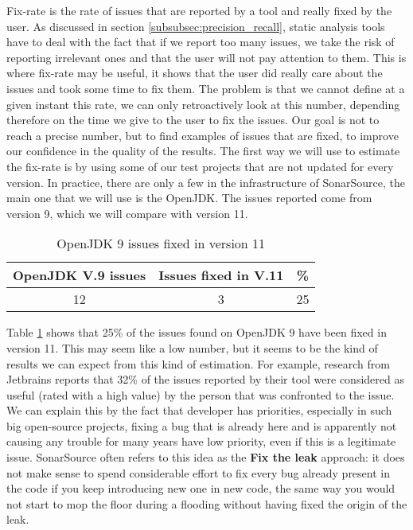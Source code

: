 Fix-rate is the rate of issues that are reported by a tool and really fixed by the user. 
As discussed in section \ref{subsubsec:precision_recall}, static analysis tools have to deal with the fact that if we report too many issues, we take the risk of reporting irrelevant ones and that the user will not pay attention to them. 
This is where fix-rate may be useful, it shows that the user did really care about the issues and took some time to fix them. \newline
The problem is that we cannot define at a given instant this rate, we can only retroactively look at this number, depending therefore on the time we give to the user to fix the issues.
Our goal is not to reach a precise number, but to find examples of issues that are fixed, to improve our confidence in the quality of the results.\newline
The first way we will use to estimate the fix-rate is by using some of our test projects that are not updated for every version.
In practice, there are only a few in the infrastructure of SonarSource, the main one that we will use is the OpenJDK.
The issues reported come from version 9, which we will compare with version 11.

\begin{table}[h]
	\centering
	\caption{OpenJDK 9 issues fixed in version 11}
	\label{table:openJDK_issues}
	\begin{tabular}{|c|c|c|}
		\hline
		\bf OpenJDK V.9  issues & \bf Issues fixed in V.11 & \bf \% \\ \hline
		12 &  3 &  25 \\ \hline
	\end{tabular}
\end{table}

Table \ref{table:openJDK_issues} shows that 25\% of the issues found on OpenJDK 9 have been fixed in version 11. 
This may seem like a low number, but it seems to be the kind of results we can expect from this kind of estimation.
For example, research from Jetbrains \cite{Bryksin:2018:DAK:3236454.3236457} reports that 32\% of the issues reported by their tool were considered as useful (rated with a high value) by the person that was confronted to the issue. 
We can explain this by the fact that developer has priorities, especially in such big open-source projects, fixing a bug that is already here and is apparently not causing any trouble for many years have low priority, even if this is a legitimate issue. 
SonarSource often refers to this idea as the \textbf{Fix the leak} approach: it does not make sense to spend considerable effort to fix every bug already present in the code if you keep introducing new one in new code, the same way you would not start to mop the floor during a flooding without having fixed the origin of the leak.

